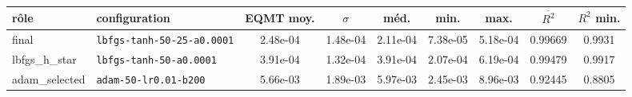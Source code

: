\begin{tabular}{l l S[table-format=1.2e-2] S[table-format=1.2e-2] S[table-format=1.2e-2] S[table-format=1.2e-2] S[table-format=1.2e-2] S[table-format=1.5] S[table-format=1.4]}
\toprule
{r\^ole} & {configuration} & {EQMT moy.} & {\(\sigma\)} & {m\'ed.} & {min.} & {max.} & {\(\overline{R^2}\)} & {\(R^2\) min.} \\
\midrule
final & \texttt{lbfgs-tanh-50-25-a0.0001} & 2.48e-04 & 1.48e-04 & 2.11e-04 & 7.38e-05 & 5.18e-04 & 0.99669 & 0.9931 \\
lbfgs\_h\_star & \texttt{lbfgs-tanh-50-a0.0001} & 3.91e-04 & 1.32e-04 & 3.91e-04 & 2.07e-04 & 6.19e-04 & 0.99479 & 0.9917 \\
adam\_selected & \texttt{adam-50-lr0.01-b200} & 5.66e-03 & 1.89e-03 & 5.97e-03 & 2.45e-03 & 8.96e-03 & 0.92445 & 0.8805 \\
\bottomrule
\end{tabular}
